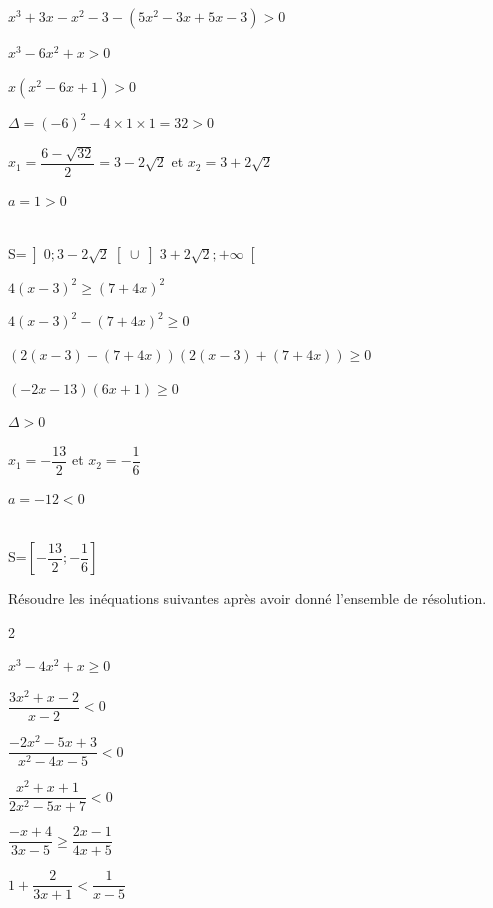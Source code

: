 \documentclass[11pt,a4paper]{article}  %
\begin{document}
\begin{enumMet}
\begin{corrBox}
			$x^3+3x-x^2-3-(5x^2-3x+5x-3)>0$
			
			$x^3-6x^2+x>0$
			
			$x(x^2-6x+1)>0$
			
			$\Delta=(-6)^2-4\times 1\times 1=32>0$
			
			$x_1=\dfrac{6-\sqrt{32}}{2}=3-2\sqrt{2}$ et $x_2=3+2\sqrt{2}$
			
			$a=1>0$
			
			
			\ \\
			S=$\left]0; 3-2\sqrt{2}\right[\cup \left]3+2\sqrt{2}; +\infty\right[$		
		\end{corrBox}
		\item $4(x-3)^2 \geqslant(7+4 x)^2$
		\begin{corrBox}
			$4(x-3)^2-(7+4x)^2\geqslant 0$
			
			$(2(x-3)-(7+4x))(2(x-3)+(7+4x))\geqslant 0$
			
			$(-2x-13)(6x+1)\geqslant0$
			
			$\Delta>0$
			
			$x_1=-\dfrac{13}{2}$ et $x_2=-\dfrac{1}{6}$
			
			$a=-12<0$
			
			
			\ \\
			S=$\left[-\dfrac{13}{2}; -\dfrac{1}{6}\right]$		
		\end{corrBox}
	\end{enumMet}


\exercice{}

Résoudre les inéquations suivantes après avoir donné l'ensemble de résolution.
\begin{multicols}{2}
	\begin{enumMet}
		\item $x^3-4 x^2+x \geqslant 0$
		\item $\dfrac{3 x^2+x-2}{x-2}<0$
		\item $\dfrac{-2 x^2-5 x+3}{x^2-4 x-5}<0$
		\item $\dfrac{x^2+x+1}{2 x^2-5 x+7}<0$
		\item $\dfrac{-x+4}{3 x-5} \geqslant \dfrac{2 x-1}{4 x+5}$
		\item $1+\dfrac{2}{3 x+1}<\dfrac{1}{x-5}$
	\end{enumMet}
\end{multicols}
\end{document}
